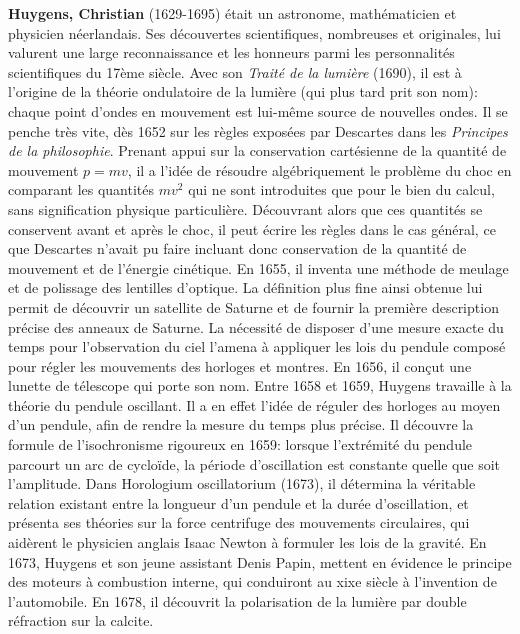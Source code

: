 \textbf{Huygens, Christian} (1629-1695) était un astronome, mathématicien et physicien néerlandais. Ses découvertes scientifiques, nombreuses et originales, lui valurent une large reconnaissance et les honneurs parmi les personnalités scientifiques du 17ème siècle. Avec son \textit{Traité de la lumière} (1690), il est à l'origine de la théorie ondulatoire de la lumière (qui plus tard prit son nom): chaque point d'ondes en mouvement est lui-même source de nouvelles ondes. Il se penche très vite, dès 1652 sur les règles exposées par Descartes dans les \textit{Principes de la philosophie}. Prenant appui sur la conservation cartésienne de la quantité de mouvement $p=mv$, il a l'idée de résoudre algébriquement le problème du choc en comparant les quantités $mv^2$ qui ne sont introduites que pour le bien du calcul, sans signification physique particulière. Découvrant alors que ces quantités se conservent avant et après le choc, il peut écrire les règles dans le cas général, ce que Descartes n'avait pu faire incluant donc conservation de la quantité de mouvement et de l'énergie cinétique. En 1655, il inventa une méthode de meulage et de polissage des lentilles d'optique. La définition plus fine ainsi obtenue lui permit de découvrir un satellite de Saturne et de fournir la première description précise des anneaux de Saturne. La nécessité de disposer d'une mesure exacte du temps pour l'observation du ciel l'amena à appliquer les lois du pendule composé pour régler les mouvements des horloges et montres. En 1656, il conçut une lunette de télescope qui porte son nom. Entre 1658 et 1659, Huygens travaille à la théorie du pendule oscillant. Il a en effet l'idée de réguler des horloges au moyen d'un pendule, afin de rendre la mesure du temps plus précise. Il découvre la formule de l'isochronisme rigoureux en 1659: lorsque l'extrémité du pendule parcourt un arc de cycloïde, la période d'oscillation est constante quelle que soit l'amplitude. Dans Horologium oscillatorium (1673), il détermina la véritable relation existant entre la longueur d'un pendule et la durée d'oscillation, et présenta ses théories sur la force centrifuge des mouvements circulaires, qui aidèrent le physicien anglais Isaac Newton à formuler les lois de la gravité. En 1673, Huygens et son jeune assistant Denis Papin, mettent en évidence le principe des moteurs à combustion interne, qui conduiront au xixe siècle à l'invention de l'automobile. En 1678, il découvrit la polarisation de la lumière par double réfraction sur la calcite.

